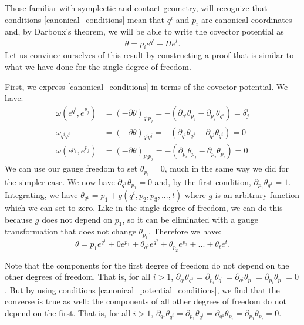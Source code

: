 \documentclass[10pt,twocolumn, nofootinbib]{revtex4-2}
\begin{document}
Those familiar with symplectic and contact geometry, will recognize that conditions \ref{canonical_conditions} mean that $q^i$ and $p_i$ are canonical coordinates and, by Darboux's theorem, we will be able to write the covector potential as
\begin{equation}\label{mdof_potential_expression}
	\theta = p_i e^{q^i} - H e^t.
\end{equation}
Let us convince ourselves of this result by constructing a proof that is similar to what we have done for the single degree of freedom.

First, we express \ref{canonical_conditions} in terms of the covector potential. We have:
\begin{equation}\label{canonical_potential_conditions}
\begin{aligned}
	\omega(e^{q^i}, e^{p_j}) &= (-\partial\theta)_{q^i p_j} = -(\partial_{q^i}\theta_{p_j} - \partial_{p_j}\theta_{q^i}) = \delta^i_j \\
	\omega_{q^i q^j} &= (-\partial\theta)_{q^i q^j} = -(\partial_{q^i}\theta_{q^j} - \partial_{q^j}\theta_{q^i}) = 0 \\
	\omega(e^{p_i}, e^{p_j}) &= (-\partial\theta)_{p_i p_j} = -(\partial_{p_i}\theta_{p_j} - \partial_{p_j}\theta_{p_i}) = 0
\end{aligned}
\end{equation}
We can use our gauge freedom to set $\theta_{p_1} = 0$, much in the same way we did for the simpler case. We now have $\partial_{q^1} \theta_{p_1} = 0$ and, by the first condition, $\partial_{p_1} \theta_{q^1} = 1$. Integrating, we have $\theta_{q^1} = p_1 + g(q^i, p_2, p_3, ..., t)$ where $g$ is an arbitrary function which we can set to zero. Like in the single degree of freedom, we can do this because $g$ does not depend on $p_1$, so it can be eliminated with a gauge transformation that does not change $\theta_{p_1}$. Therefore we have:
\begin{equation}
	\theta = p_1 e^{q^1} + 0 e^{p_1} + \theta_{q^2} e^{q^2} + \theta_{p_2} e^{p_2} + ... + \theta_{t} e^{t}.
\end{equation}

Note that the components for the first degree of freedom do not depend on the other degrees of freedom. That is, for all $i>1$, $\partial_{q^i} \theta_{q^1} = \partial_{p_i} \theta_{q^1} = \partial_{q^i} \theta_{p_1} = \partial_{p_i} \theta_{p_1} = 0$. But by using conditions \ref{canonical_potential_conditions}, we find that the converse is true as well: the components of all other degrees of freedom do not depend on the first. That is, for all $i>1$, $\partial_{q^1} \theta_{q^i} = \partial_{p_1} \theta_{q^i} = \partial_{q^1} \theta_{p_i} = \partial_{p_1} \theta_{p_i} = 0$.
\end{document}
